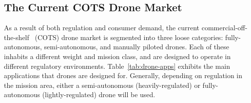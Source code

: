 \subsection{The Current COTS Drone Market}
\label{sec:current-market}
As a result of both regulation and consumer demand, the current commercial-off-the-shelf~\cite{FAR} (COTS) drone market is segmented into three loose categories: fully-autonomous, semi-autonomous, and manually piloted drones. Each of these inhabits a different weight and mission class, and are designed to operate in different regulatory environments. Table~\ref{tab:drone-apps} exhibits the main applications that drones are designed for. Generally, depending on regulation in the mission area, either a semi-autonomous (heavily-regulated) or fully-autonomous (lightly-regulated) drone will be used. 

